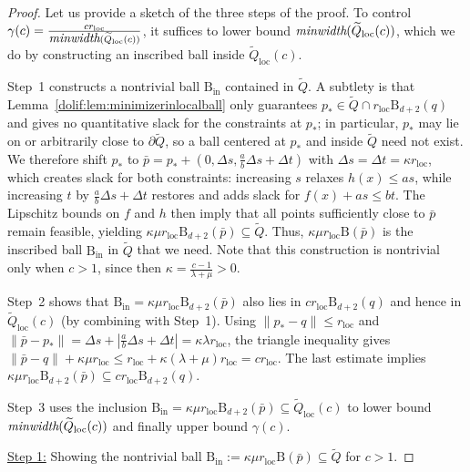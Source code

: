 \documentclass[10pt,a4paper]{amsart}
\newcommand{\Q}{\widetilde{Q}}
\newcommand{\ball}{\mathrm{B}}
\newcommand{\local}{\mathrm{loc}}
\begin{document}
\begin{proof}  
Let us provide a sketch of the three steps of the proof.
To control $\gamma(c)=\frac{c r_{\local}}{\mbox{\em minwidth}(\Q_{\local}(c))}$, it suffices to lower bound
$\mbox{\em minwidth}(\Q_{\local}(c))$, which we do by constructing an inscribed ball inside
$\Q_{\local}(c)$.

Step~1 constructs a nontrivial ball $\ball_{\mathrm{in}}$ contained in $\Q$.
A subtlety is that Lemma~\ref{dolif:lem:minimizerinlocalball} only guarantees $ p_*\in \Q\cap r_{\local} \ball_{d+2}( q)$
and gives no quantitative slack for the constraints at $ p_*$; in particular, $ p_*$ may lie on or arbitrarily close to
$\partial\Q$, so a ball centered at $ p_*$ and inside $\Q$ need not exist.
We therefore shift $ p_*$ to
$\bar p= p_*+\left(0,\Delta s,\frac{a}{b}\Delta s+\Delta t\right)$ with $\Delta s=\Delta t=\kappa r_{\local}$,
which creates slack for both constraints: increasing $s$ relaxes $h(x)\le as$, while increasing $t$ by
$\frac{a}{b}\Delta s+\Delta t$ restores and adds slack for $f(x)+as\le bt$.
The Lipschitz bounds on $f$ and $h$ then imply that all points sufficiently close to $\bar p$ remain feasible,
yielding $\kappa\mu r_{\local} \ball_{d+2}(\bar p)\subseteq \Q$. Thus, $\kappa\mu r_{\local} \ball(\bar p)$ is the inscribed ball $\ball_{\mathrm{in}}$ in $\Q$ that we need. Note that this construction is nontrivial only when $c>1$, since then $\kappa=\frac{c-1}{\lambda+\mu}>0$.

Step~2 shows that $\ball_{\mathrm{in}}=\kappa\mu r_{\local}\ball_{d+2}(\bar p)$ also lies in $c r_{\local} \ball_{d+2}( q)$ and hence in $\Q_{\local}(c)$ (by combining with Step~1).
Using $\| p_*- q\|\le r_{\local}$ and
$\|\bar p- p_*\|=\Delta s+\left|\frac{a}{b}\Delta s+\Delta t\right|=\kappa\lambda r_{\local}$,
the triangle inequality gives
$\|\bar p- q\|+\kappa\mu r_{\local}\le r_{\local}+\kappa(\lambda+\mu)r_{\local}=c r_{\local}$. The last estimate implies $\kappa\mu r_{\local}\ball_{d+2}(\bar p)\subseteq c r_{\local}\ball_{d+2}( q)$. 

Step~3 uses the inclusion $\ball_{\mathrm{in}}=\kappa\mu r_{\local} \ball_{d+2}(\bar p)\subseteq \Q_{\local}(c)$ to lower bound $\mbox{\em minwidth}(\Q_{\local}(c))$ and finally upper bound $\gamma(c)$. 





\smallskip
\underline{Step 1:} Showing the nontrivial ball $\ball_{\mathrm{in}}:=\kappa\mu r_\local \ball(\bar p)\subseteq \Q$ for $c>1$.


\end{proof}
\end{document}
